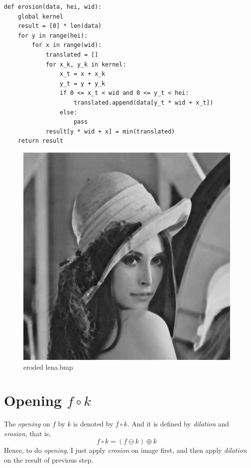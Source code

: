 \documentclass[14pt,a4paper]{extarticle}
\begin{document}
\begin{lstlisting}
def erosion(data, hei, wid):
    global kernel
    result = [0] * len(data)
    for y in range(hei):
        for x in range(wid):
            translated = []
            for x_k, y_k in kernel:
                x_t = x + x_k
                y_t = y + y_k
                if 0 <= x_t < wid and 0 <= y_t < hei:
                    translated.append(data[y_t * wid + x_t])
                else:
                    pass
            result[y * wid + x] = min(translated)
    return result
\end{lstlisting}

\begin{figure}[H]
\centering
\includegraphics[scale=0.6]{lena-eroded.bmp}
\caption{eroded lena.bmp}
\label{fig:lena-eroded.bmp}
\end{figure}

\section{Opening $f \circ k$}

The \textit{opening} on $f$ by $k$ is denoted by $f \circ k$. And it is defined by \textit{dilation} and \textit{erosion}, that is,
\[ f \circ k = (f \ominus k) \oplus k \]
Hence, to do \textit{opening}, I just apply \textit{erosion} on image first, and then apply \textit{dilation} on the result of previous step.
\end{document}
